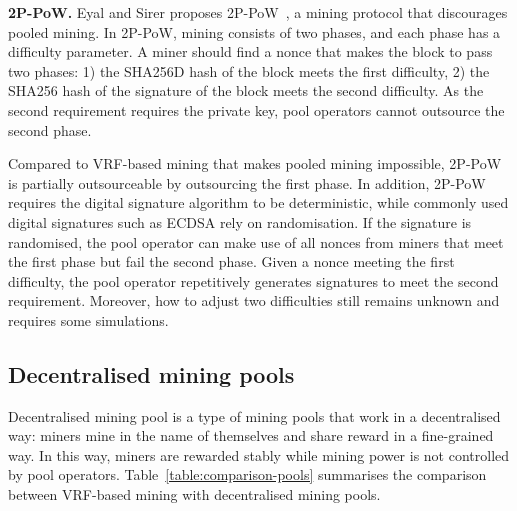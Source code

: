 \textbf{2P-PoW.}
Eyal and Sirer proposes 2P-PoW~\cite{2P-PoW}, a mining protocol that discourages pooled mining.
In 2P-PoW, mining consists of two phases, and each phase has a difficulty parameter.
A miner should find a nonce that makes the block to pass two phases: 1) the SHA256D hash of the block meets the first difficulty, 2) the SHA256 hash of the signature of the block meets the second difficulty.
As the second requirement requires the private key, pool operators cannot outsource the second phase.

Compared to VRF-based mining that makes pooled mining impossible, 2P-PoW is partially outsourceable by outsourcing the first phase.
In addition, 2P-PoW requires the digital signature algorithm to be deterministic, while commonly used digital signatures such as ECDSA rely on randomisation.
If the signature is randomised, the pool operator can make use of all nonces from miners that meet the first phase but fail the second phase.
Given a nonce meeting the first difficulty, the pool operator repetitively generates signatures to meet the second requirement.
Moreover, how to adjust two difficulties still remains unknown and requires some simulations.




\subsection{Decentralised mining pools}



Decentralised mining pool is a type of mining pools that work in a decentralised way: miners mine in the name of themselves and share reward in a fine-grained way.
In this way, miners are rewarded stably while mining power is not controlled by pool operators.
Table~\ref{table:comparison-pools} summarises the comparison between VRF-based mining with decentralised mining pools.


